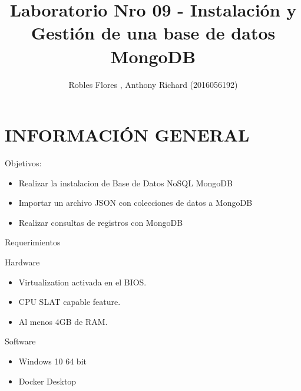 \documentclass[preprint,12pt]{elsarticle}
\begin{document}
	\begin{frontmatter}
		\title{\huge Laboratorio Nro 09 -  Instalación y Gestión de una base de datos MongoDB}
		\address{Universidad Privada de Tacna}
		\address{Escuela Profesional de Ingeniería de Sistemas}
		\address{Base de DAtos II}		
		\author{Robles Flores , Anthony Richard             	(2016056192)}		
		\address{Tacna, Perú}
\end{frontmatter}

\section{INFORMACIÓN GENERAL}
Objetivos:
\begin{itemize}
\item Realizar la instalacion de Base de Datos NoSQL MongoDB
\item Importar un archivo JSON con colecciones de datos a MongoDB
\item Realizar consultas de registros con MongoDB
\end{itemize}

Requerimientos

Hardware
\begin{itemize}
\item Virtualization activada en el BIOS.
\item CPU SLAT capable feature.
\item Al menos 4GB de RAM.
\end{itemize}

Software
\begin{itemize}
\item Windows 10 64 bit
\item Docker Desktop
\end{itemize}

\end{document}
